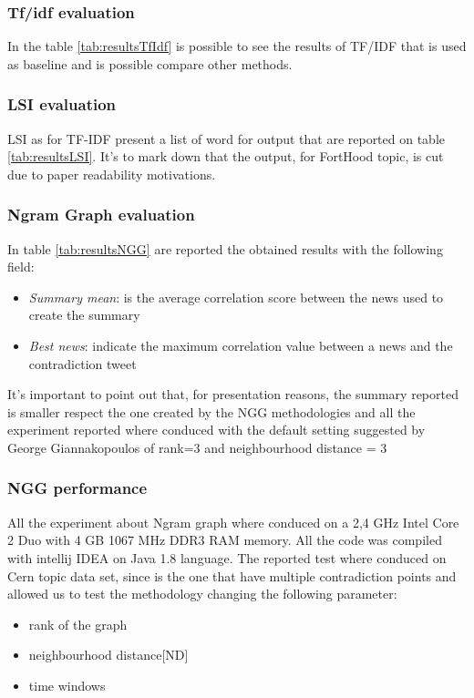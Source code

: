 \subsubsection*{Tf/idf evaluation}
In the table \ref{tab:resultsTfIdf} is possible to see the results of TF/IDF that is used as baseline and is possible compare other methods.

\subsubsection*{LSI evaluation}
LSI as for TF-IDF present a list of word for output that are reported on table \ref{tab:resultsLSI}. It's to mark down that the output, for FortHood topic, is cut due to paper readability motivations.



\subsubsection*{Ngram Graph evaluation}
In table \ref{tab:resultsNGG} are reported the obtained results with the following field:
\begin{itemize}
	\item \emph{Summary mean}: is the average correlation score between the news used to create the summary
	\item \emph{Best news}: indicate the maximum correlation value between a news and the contradiction tweet
\end{itemize}
It's important to point out that, for presentation reasons, the summary reported is smaller respect the one created by the NGG methodologies and all the experiment reported where conduced with the default setting suggested by George Giannakopoulos of rank=3 and neighbourhood distance = 3










\subsubsection*{NGG performance}
All the experiment about Ngram graph where conduced on a 2,4 GHz Intel Core 2 Duo with 4 GB 1067 MHz DDR3 RAM memory.
 All the code was compiled with intellij IDEA on Java 1.8 language. 
The reported test where conduced on Cern topic data set, since is the one that have multiple contradiction points and allowed us to test the methodology changing the following parameter:
\begin{itemize}
	\item rank of the graph
	\item neighbourhood distance[ND]
	\item time windows
\end{itemize}


